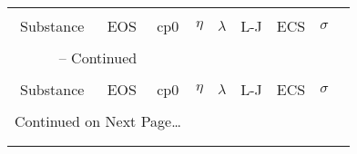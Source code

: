 \documentclass{article}
\begin{document}
\begin{center}
\begin{longtable}{ccccccccc}

\hline \hline \\[-2ex]
	Substance & EOS & cp0 & $\eta$ & $\lambda$ & L-J & ECS  & $\sigma$ \\
   \\[-1.8ex]
\endfirsthead

\multicolumn{3}{c}{{\tablename} \thetable{} -- Continued} \\[0.5ex]
  \hline \hline \\[-2ex]
	Substance & EOS & cp0 & $\eta$ & $\lambda$ & L-J & ECS  & $\sigma$ \\
  \\[-1.8ex]
\endhead

  \multicolumn{3}{l}{{Continued on Next Page\ldots}} \\
\endfoot

  \\[-1.8ex] \hline \hline
\endlastfoot


\hline\hline



\end{longtable}
\end{center}

\clearpage


{}
\end{document}
